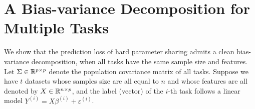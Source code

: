 \section{A Bias-variance Decomposition for Multiple Tasks}\label{sec_same}

We show that the prediction loss of hard parameter sharing admits a clean bias-variance decomposition, when all tasks have the same sample size and features.
Let $\Sigma\in \mathbb{R}^{p\times p}$ denote the population covariance matrix of all tasks.
Suppose we have $t$ datasets whose samples size are all equal to $n$ and whose features are all denoted by $X \in \mathbb{R}^{n \times p}$, and the label (vector) of the $i$-th task follows a linear model $Y^{(i)} = X \beta^{(i)} + \varepsilon^{(i)}$.
